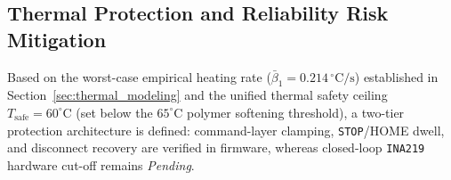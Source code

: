 \documentclass[lettersize,journal]{IEEEtran}
\begin{document}
	\begin{table}[!t]
		\centering
		\caption{SOFIA Bidirectional Communication Protocol Specification}
		\label{tab:sofia_message_contract}
		\scriptsize
		\setlength{\tabcolsep}{3pt}
		\renewcommand{\arraystretch}{0.88}
	\end{table}
	
	\subsection{Thermal Protection and Reliability Risk Mitigation}
	\label{sec:risk_mitigation}
	
	Based on the worst-case empirical heating rate ($\bar{\beta}_1 = 0.214\,^\circ\text{C/s}$) established in Section~\ref{sec:thermal_modeling} and the unified thermal safety ceiling $T_{\text{safe}} = 60^\circ\text{C}$ (set below the $65^\circ\text{C}$ polymer softening threshold), a two-tier protection architecture is defined: command-layer clamping, \texttt{STOP}/HOME dwell, and disconnect recovery are verified in firmware, whereas closed-loop \texttt{INA219} hardware cut-off remains \textit{Pending}.
	
\end{document}
